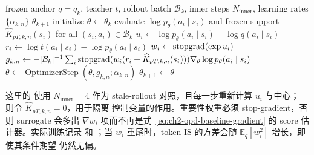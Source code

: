 \begin{algorithm}[ht]
\caption{Token-IS OPD baseline\\{\small\textit{Semantics: 复用 anchor rollout；仅修正 prefix 条件下的 token 测度}}}
\begin{algorithmic}[1]
\Require frozen anchor $q=q_k$, teacher $t$, rollout batch $\mathcal B_k$, inner steps $N_{\mathrm{inner}}$, learning rates $\{\alpha_{k,n}\}$
\Ensure $\theta_{k+1}$
\State initialize $\theta\gets\theta_k$
    \State evaluate $\log p_\theta(a_i\mid s_i)$ and frozen-support $\widehat K_{pT,k,n}(s_i)$ for all $(s_i,a_i)\in\mathcal B_k$
    \State $u_i\gets\log p_\theta(a_i\mid s_i)-\log q(a_i\mid s_i)$
    \State $r_i\gets\log t(a_i\mid s_i)-\log p_\theta(a_i\mid s_i)$
    \State $w_i\gets\operatorname{stopgrad}(\exp u_i)$
    \State $g_{k,n}\gets-|\mathcal B_k|^{-1}\sum_i\operatorname{stopgrad}(w_i(r_i+\widehat K_{pT,k,n}(s_i)))\nabla_\theta\log p_\theta(a_i\mid s_i)$
    \State $\theta\gets\operatorname{OptimizerStep}(\theta,g_{k,n};\alpha_{k,n})$
\EndFor
\State \Return $\theta_{k+1}\gets\theta$
\end{algorithmic}
\end{algorithm}

这里的  使用 $N_{\mathrm{inner}}=4$ 作为 stale-rollout 对照，且每一步重新计算 $u_i$ 与中心； 则令 $\widehat K_{pT,k,n}=0$，用于隔离 控制变量的作用。重要性权重必须 stop-gradient，否则 surrogate 会多出 $\nabla w_i$ 项而不再是式~\eqref{eq:ch2-opd-baseline-gradient} 的 score 估计器。实际训练记录  和 ；当 $w_i$ 重尾时，token-IS 的方差会随 $\mathbb E_q[w_i^2]$ 增长，即使其条件期望 仍然无偏。
